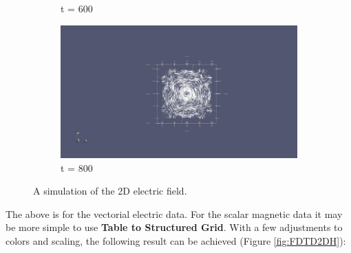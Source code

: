 \begin{figure}[h!]
\begin{subfigure}{.49\textwidth}
    	\caption{t = 600}
    \end{subfigure}
    \begin{subfigure}{.49\textwidth}
    	\centering
    	\includegraphics[width=.95\linewidth]{Figures/FDTD2DE4}
    	\caption{t = 800}
    \end{subfigure}
	\decoRule
	\caption[2D Electric Field Simulation]{A simulation of the 2D electric field.}
	\label{fig:FDTD2DE}
\end{figure}

The above is for the vectorial electric data. For the scalar magnetic data it may be more simple to use \textbf{Table to Structured Grid}. With a few adjustments to colors and scaling, the following result can be achieved (Figure \ref{fig:FDTD2DH}):

